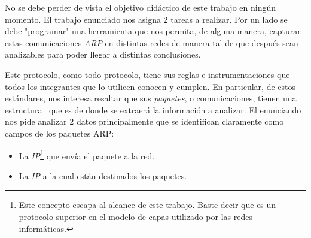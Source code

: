 \PARstartCal No se debe perder de vista el objetivo did\'actico de
	este trabajo en ning\'un momento. El trabajo enunciado nos asigna
    2 tareas a realizar. Por un lado se debe "programar" una herramienta
    que nos permita, de alguna manera, capturar estas comunicaciones
   	\textit{ARP} en distintas redes de manera tal de que despu\'es sean
    analizables para poder llegar a distintas conclusiones.
    
\par Este protocolo, como todo protocolo, tiene sus reglas e instrumentaciones
	que todos los integrantes que lo utilicen conocen y cumplen. En particular,
    de estos est\'andares, nos interesa resaltar que sus \textit{paquetes},
    o comunicaciones, tienen una estructura~\cite{rfc826} que es de donde 
    se extraer\'a la informaci\'on a analizar. El enunciando nos pide analizar 2
    datos principalmente que se identifican claramente como campos de los
    paquetes ARP:

\begin{itemize}
	\item La \textit{IP}\footnote{Este concepto escapa al alcance de este trabajo.
    Baste decir que es un protocolo superior en el modelo de capas utilizado por las
    redes inform\'aticas.} que env\'ia el paquete a la red.
    
    \item La \textit{IP} a la cual est\'an destinados los paquetes.
\end{itemize}

\bigskip

